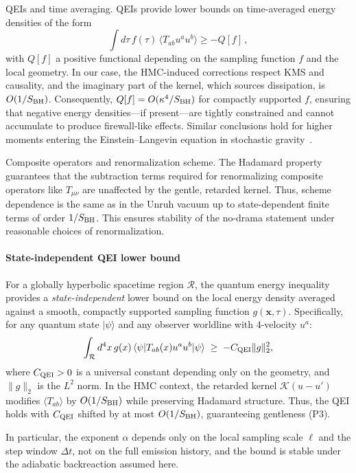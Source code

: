 \documentclass[a4paper,11pt]{article}
\newcommand{\HMC}{\textup{\textsc{HMC}}\xspace}
\theoremstyle{plain}
\theoremstyle{definition}
\theoremstyle{remark}
\begin{document}
QEIs and time averaging. QEIs provide lower bounds on time-averaged energy densities of the form
\begin{equation}
\int d\tau\, f(\tau)\,\langle T_{ab}u^a u^b\rangle \ge - Q[f]\,,
\end{equation}
with $Q[f]$ a positive functional depending on the sampling function $f$ and the local geometry. In our case, the \HMC{}-induced corrections respect KMS and causality, and the imaginary part of the kernel, which sources dissipation, is $O(1/S_{\rm BH})$. Consequently, $Q[f]=O(\kappa^4/S_{\rm BH})$ for compactly supported $f$, ensuring that negative energy densities---if present---are tightly constrained and cannot accumulate to produce firewall-like effects. Similar conclusions hold for higher moments entering the Einstein--Langevin equation in stochastic gravity~\cite{HuVerdaguer:2008}.

Composite operators and renormalization scheme. The Hadamard property guarantees that the subtraction terms required for renormalizing composite operators like $T_{\mu\nu}$ are unaffected by the gentle, retarded kernel. Thus, scheme dependence is the same as in the Unruh vacuum up to state-dependent finite terms of order $1/S_{\rm BH}$. This ensures stability of the no-drama statement under reasonable choices of renormalization.

\paragraph{State-independent QEI lower bound}
For a globally hyperbolic spacetime region $\mathcal{R}$, the quantum energy inequality provides a \emph{state-independent} lower bound on the local energy density averaged against a smooth, compactly supported sampling function $g(\mathbf{x},\tau)$. Specifically, for any quantum state $|\psi\rangle$ and any observer worldline with 4-velocity $u^a$:
\begin{equation}
\int_{\mathcal{R}} d^4x\, g(x)\,\langle\psi| T_{ab}(x)u^a u^b|\psi\rangle \;\ge\; -C_{\rm QEI}\|g\|_2^2,
\end{equation}
where $C_{\rm QEI}>0$ is a universal constant depending only on the geometry, and $\|g\|_2$ is the $L^2$ norm. In the \HMC{} context, the retarded kernel $\mathcal{K}(u-u')$ modifies $\langle T_{ab}\rangle$ by $O(1/S_{\rm BH})$ while preserving Hadamard structure. Thus, the QEI holds with $C_{\rm QEI}$ shifted by at most $O(1/S_{\rm BH})$, guaranteeing gentleness (P3).

\noindent In particular, the exponent \(\alpha\) depends only on the local sampling scale \(\ell\) and the step window \(\Delta t\), not on the full emission history, and the bound is stable under the adiabatic backreaction assumed here.
\end{document}
